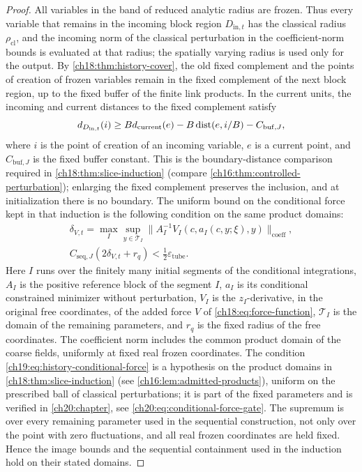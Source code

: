 \begin{proof}
All variables in the band of reduced analytic radius are frozen. Thus every variable that remains in the incoming block region $D_{\mathrm{in},t}$ has the classical radius $\rho_{\mathrm{cl}}$, and the incoming norm of the classical perturbation in the coefficient-norm bounds is evaluated at that radius; the spatially varying radius is used only for the output. By \cref{ch18:thm:history-cover}, the old fixed complement and the points of creation of frozen variables remain in the fixed complement of the next block region, up to the fixed buffer of the finite link products. In the current units, the incoming and current distances to the fixed complement satisfy
\[
 d_{D_{\mathrm{in},t}}(i)\ge Bd_{\mathrm{current}}(e)-B\operatorname{dist}(e,i/B)-C_{\mathrm{buf},J},
\]
where $i$ is the point of creation of an incoming variable, $e$ is a current point, and $C_{\mathrm{buf},J}$ is the fixed buffer constant. This is the boundary-distance comparison required in \cref{ch18:thm:slice-induction} (compare \cref{ch16:thm:controlled-perturbation}); enlarging the fixed complement preserves the inclusion, and at initialization there is no boundary. The uniform bound on the conditional force kept in that induction is the following condition on the same product domains:
\begin{equation}\label{ch19:eq:history-conditional-force}
 \begin{gathered}
 \delta_{V,t}=\max_I\sup_{y\in\mathcal T_I}
 \bigl\lVert A_I^{-1}V_I(c,a_I(c,y;\xi),y)\bigr\rVert_{\mathrm{coeff}},\\
 C_{\mathrm{seq},J}(2\delta_{V,t}+r_q)<\tfrac12\varepsilon_{\mathrm{tube}}.
 \end{gathered}
\end{equation}
Here $I$ runs over the finitely many initial segments of the conditional integrations, $A_I$ is the positive reference block of the segment $I$, $a_I$ is its conditional constrained minimizer without perturbation, $V_I$ is the $z_I$-derivative, in the original free coordinates, of the added force $V$ of \eqref{ch18:eq:force-function}, $\mathcal T_I$ is the domain of the remaining parameters, and $r_q$ is the fixed radius of the free coordinates. The coefficient norm includes the common product domain of the coarse fields, uniformly at fixed real frozen coordinates. The condition \eqref{ch19:eq:history-conditional-force} is a hypothesis on the product domains in \cref{ch18:thm:slice-induction} (see \cref{ch16:lem:admitted-products}), uniform on the prescribed ball of classical perturbations; it is part of the fixed parameters and is verified in \cref{ch20:chapter}, see \eqref{ch20:eq:conditional-force-gate}. The supremum is over every remaining parameter used in the sequential construction, not only over the point with zero fluctuations, and all real frozen coordinates are held fixed. Hence the image bounds and the sequential containment used in the induction hold on their stated domains.


\end{proof}
